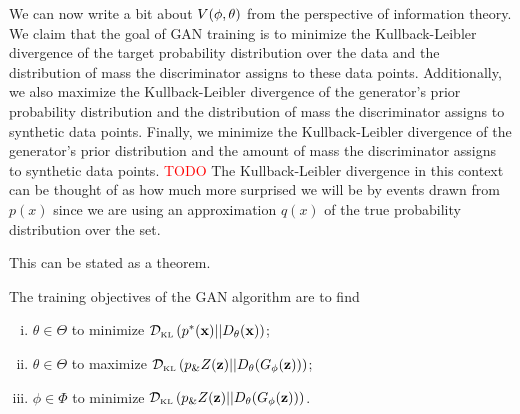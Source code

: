 We can now write a bit about $V(\phi, \theta)$ from the perspective of information
theory. We claim that the goal of GAN training is to minimize the
Kullback-Leibler divergence of the target probability distribution
over the data and the distribution of mass the discriminator assigns
to these data points.  Additionally, we also maximize the
Kullback-Leibler divergence of the generator's prior probability
distribution and the distribution of mass the discriminator assigns to
synthetic data points. Finally, we minimize the Kullback-Leibler
divergence of the generator's prior distribution and the amount of
mass the discriminator assigns to synthetic data points.
\textcolor{red}{TODO}
The Kullback-Leibler divergence in this context can be thought of as
how much more surprised we will be by events drawn from $p(x)$ since
we are using an approximation $q(x)$ of the true probability
distribution over the set.

This can be stated as a theorem.

\begin{theorem}
  \label{theorem:mine-1}
  \label{contribution:one}
  The training objectives of the GAN algorithm are to find
  \begin{enumerate}[(i)]
  \item $\theta \in \Theta$ to minimize $\mathcal{D}_{\text{\tiny KL}}\left( p^*(\mathbf{x}) \middle| \middle| D_\theta(\mathbf{x}) \right)$;
  \item $\theta \in \Theta$ to maximize $\mathcal{D}_{\text{\tiny KL}}\left( p_\&Z(\mathbf{z}) \middle| \middle| D_\theta(G_\phi(\mathbf{z})) \right)$;
  \item $\phi \in \Phi$ to minimize $\mathcal{D}_{\text{\tiny KL}}\left( p_\&Z(\mathbf{z}) \middle| \middle| D_\theta(G_\phi(\mathbf{z})) \right)$.
  \end{enumerate}
\end{theorem}

